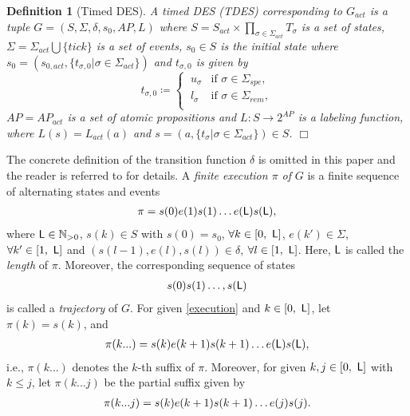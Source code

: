 \documentclass[journal,twoside,web]{IEEEtran}
\newcommand{\qedwhite}{\hfill \ensuremath{\Box}}
\newtheorem{dfn}{Definition}
\newcommand{\req}[1]{\eqref{#1}}
\newcommand{\Len}{{\sf L}}
\begin{document}
\begin{dfn}[Timed DES]\label{def:G}
A timed DES (TDES) corresponding to $G_{act}$ is a tuple $G=(S, \Sigma, \delta, s_0,AP, L)$ where $S = S_{act} \times \prod_{\sigma\in \Sigma_{act}} T_{\sigma}$ is a set of states, $\Sigma= \Sigma_{act} \bigcup \{\textit{tick}\}$ is a set of events, $s_0 \in S$ is the initial state where $s_0 = (s_{0,act}, \{ t_{\sigma,0} | \sigma \in \Sigma_{act} \})$ and $t_{\sigma,0}$ is given by
					\begin{equation}
						t_{\sigma, 0} \coloneqq \left\{
						\begin{array}{ll}  
							\ u_{\sigma}  & \mbox{if } {\sigma} \in \Sigma_{spe}, \\
							\ l_{\sigma} & \mbox{if } {\sigma } \in \Sigma_{rem}, \\
						\end{array} \right.
					\end{equation}	
$AP = AP_{act} $ is a set of  atomic propositions and $L  : S \rightarrow 2^{AP} $ is a labeling function, where $L(s)=L_{act}(a)$ and $s = (a, \{ t_\sigma | \sigma \in \Sigma_{act} \}) \in S$. \qedwhite \end{dfn}
%
The concrete definition of the transition function $\delta$ is omitted in this paper and the reader is referred to \cite{BW1994} for details.
%
%
%
%
A \textit{finite execution $\pi$ of} $G$ is a finite sequence of alternating states and events
\begin{align}\label{execution}
\pi = s(0)e(1)s(1)\ldots e(\Len) s(\Len), 
\end{align}
where $\Len \in \mathbb{N}_{> 0}$, 
$s(k) \in S$ with $s(0) = s_0$, $\forall k\in[0,\ \Len]$, $e(k') \in \Sigma$, $\forall k' \in [1,\ \Len]$ and $(s({l-1}), e({l}), s(l)) \in \delta$, $\forall l\in [1,\ \Len]$. 
Here, $\Len$ is called the \textit{length} of $\pi$.
Moreover, the corresponding sequence of states 
\begin{align}
s(0) s(1) \ldots, s(\Len) \notag
\end{align}
is called a \textit{trajectory} of $G$. 
For given \req{execution} and $k\in[0,\ \Len]$, let $\pi(k) = s(k)$, and 
\begin{align}
\pi(k...) = s(k) e({k+1}) s({k+1}) \ldots e({\Len}) s({\Len}), \notag 
\end{align}
i.e., $\pi(k...)$ denotes the $k$-th suffix of $\pi$. Moreover, for given $k, j\in[0,\ \Len]$ with $k\leq j$, let $\pi(k...j)$ be the partial suffix given by 
\begin{align}
\pi(k...j) = s(k) e({k+1}) s({k+1}) \ldots e({j}) s({j}). \notag 
\end{align}
\end{document}
